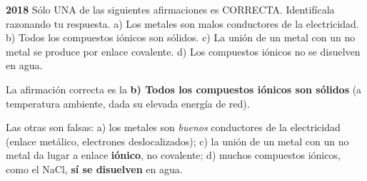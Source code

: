 \begin{exerciseEVAU}

    \textbf{ 2018 } Sólo UNA de las siguientes afirmaciones es CORRECTA. Identifícala razonando tu respuesta. a) Los metales son malos conductores de la electricidad. b) Todos los compuestos iónicos son sólidos. c) La unión de un metal con un no metal se produce por enlace covalente. d) Los compuestos iónicos no se disuelven en agua.

    \begin{solu}


        La afirmación correcta es la \textbf{b) Todos los compuestos iónicos son sólidos} (a temperatura ambiente, dada su elevada energía de red).

        Las otras son falsas: a) los metales son \emph{buenos} conductores de la electricidad (enlace metálico, electrones deslocalizados); c) la unión de un metal con un no metal da lugar a enlace \textbf{iónico}, no covalente; d) muchos compuestos iónicos, como el NaCl, \textbf{sí se disuelven} en agua.
    \end{solu}
\end{exerciseEVAU}

